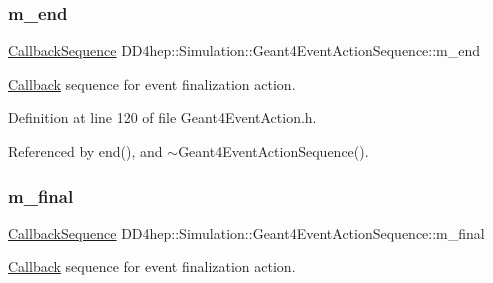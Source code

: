 \hypertarget{class_d_d4hep_1_1_simulation_1_1_geant4_event_action_sequence_ae633e2bffea90162cc1081deca8c395c}{}\label{class_d_d4hep_1_1_simulation_1_1_geant4_event_action_sequence_ae633e2bffea90162cc1081deca8c395c} 
\subsubsection{\texorpdfstring{m\+\_\+end}{m\_end}}
{\footnotesize\ttfamily \hyperlink{struct_d_d4hep_1_1_callback_sequence}{Callback\+Sequence} D\+D4hep\+::\+Simulation\+::\+Geant4\+Event\+Action\+Sequence\+::m\+\_\+end\hspace{0.3cm}{\ttfamily [protected]}}



\hyperlink{class_d_d4hep_1_1_callback}{Callback} sequence for event finalization action. 



Definition at line 120 of file Geant4\+Event\+Action.\+h.



Referenced by end(), and $\sim$\+Geant4\+Event\+Action\+Sequence().

\hypertarget{class_d_d4hep_1_1_simulation_1_1_geant4_event_action_sequence_af2e1129997fe4ef05c0bf2e16f29cbca}{}\label{class_d_d4hep_1_1_simulation_1_1_geant4_event_action_sequence_af2e1129997fe4ef05c0bf2e16f29cbca} 
\subsubsection{\texorpdfstring{m\+\_\+final}{m\_final}}
{\footnotesize\ttfamily \hyperlink{struct_d_d4hep_1_1_callback_sequence}{Callback\+Sequence} D\+D4hep\+::\+Simulation\+::\+Geant4\+Event\+Action\+Sequence\+::m\+\_\+final\hspace{0.3cm}{\ttfamily [protected]}}



\hyperlink{class_d_d4hep_1_1_callback}{Callback} sequence for event finalization action. 



